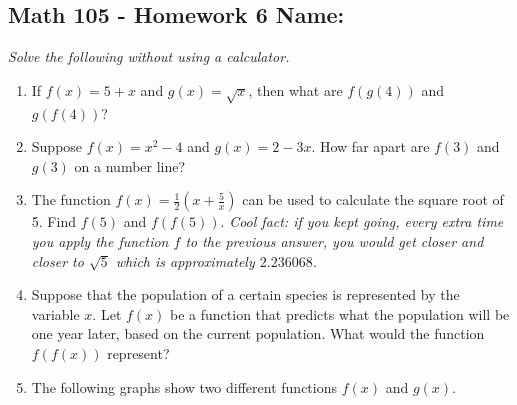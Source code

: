 \documentclass[10pt]{article}
\begin{document}
\pagestyle{empty}
\subsection*{Math 105 - Homework 6 \hfill Name: \underline{\hspace*{2in}}}
\textit{Solve the following without using a calculator.}

\noindent
\begin{enumerate}


\item If $f(x) = 5+x$ and $g(x) = \sqrt{x}$, then what are $f(g(4))$ and $g(f(4))$? 
\vfill

\item Suppose $f(x) = x^2-4$ and $g(x) = 2-3x$.  How far apart are $f(3)$ and $g(3)$ on a number line? 
\vfill



\item The function $f(x) = \frac{1}{2}\left(x+\frac{5}{x}\right)$ can be used to calculate the square root of 5.  Find $f(5)$ and $f(f(5))$.  \textit{Cool fact: if you kept going, every extra time you apply the function $f$ to the previous answer, you would get closer and closer to $\sqrt{5}$ which is approximately $2.236068$.}
\vfill

\item Suppose that the population of a certain species is represented by the variable $x$.  Let $f(x)$ be a function that predicts what the population will be one year later, based on the current population.  What would the function $f(f(x))$ represent?  
\vfill

\item The following graphs show two different functions $f(x)$ and $g(x)$. 

\begin{center}
\end{center}


\end{enumerate}
\end{document}

